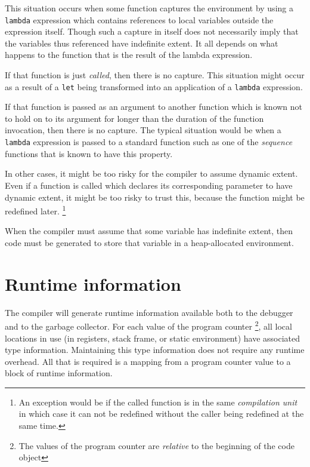 This situation occurs when some function captures the environment by
using a \texttt{lambda} expression which contains references to local
variables outside the expression itself.  Though such a capture in
itself does not necessarily imply that the variables thus referenced
have indefinite extent.  It all depends on what happens to the
function that is the result of the lambda expression.  

If that function is just \emph{called}, then there is no capture.  This
situation might occur as a result of a \texttt{let} being transformed
into an application of a \texttt{lambda} expression.  

If that function is passed as an argument to another function which is
known not to hold on to its argument for longer than the duration of
the function invocation, then there is no capture.  The typical
situation would be when a \texttt{lambda} expression is passed to a
standard \commonlisp{} function such as one of the \emph{sequence} functions
that is known to have this property.  

In other cases, it might be too risky for the compiler to assume
dynamic extent.  Even if a function is called which declares its
corresponding parameter to have dynamic extent, it might be too risky
to trust this, because the function might be redefined later.%
\footnote{An exception would be if the called function is in the same
  \emph{compilation unit} in which case it can not be redefined
  without the caller being redefined at the same time.}

When the compiler must assume that some variable has indefinite
extent, then code must be generated to store that variable in a
heap-allocated environment.

\section{Runtime information}

The compiler will generate runtime information available both to the
debugger and to the garbage collector.  For each value of the program
counter%
\footnote{The values of the program counter are \emph{relative} to the
  beginning of the code object}, all local locations in use (in
registers, stack frame, or static environment) have associated type
information.  Maintaining this type information does not require any
runtime overhead.  All that is required is a mapping from a program
counter value to a block of runtime information.

